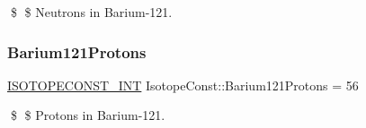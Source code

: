 \$ \$ Neutrons in Barium-\/121. \mbox{\label{group___isotope_const-_barium-_ba121_ga20e09b12af283e73e44a5eff9782f95d}} 
\subsubsection{\texorpdfstring{Barium121\+Protons}{Barium121Protons}}
{\footnotesize\ttfamily \mbox{\hyperlink{group___isotope_const-_macros_ga5f18360b3e99483a35c32d789e62621c}{I\+S\+O\+T\+O\+P\+E\+C\+O\+N\+S\+T\+\_\+\+I\+NT}} Isotope\+Const\+::\+Barium121\+Protons = 56}

\$ \$ Protons in Barium-\/121. 